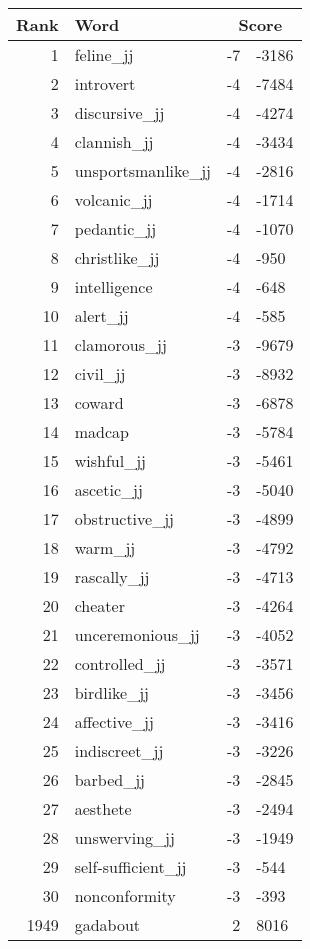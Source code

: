 \begin{longtable}[!htbp]{| rlr@{.}l |}
    \hline
    \textbf{Rank} & \textbf{Word} & \multicolumn{2}{c|}{\textbf{Score}} \\
    \hline
    \endhead
    1 & feline\_jj & -7 & -3186 \\
    2 & introvert & -4 & -7484 \\
    3 & discursive\_jj & -4 & -4274 \\
    4 & clannish\_jj & -4 & -3434 \\
    5 & unsportsmanlike\_jj & -4 & -2816 \\
    6 & volcanic\_jj & -4 & -1714 \\
    7 & pedantic\_jj & -4 & -1070 \\
    8 & christlike\_jj & -4 & -950 \\
    9 & intelligence & -4 & -648 \\
    10 & alert\_jj & -4 & -585 \\
    11 & clamorous\_jj & -3 & -9679 \\
    12 & civil\_jj & -3 & -8932 \\
    13 & coward & -3 & -6878 \\
    14 & madcap & -3 & -5784 \\
    15 & wishful\_jj & -3 & -5461 \\
    16 & ascetic\_jj & -3 & -5040 \\
    17 & obstructive\_jj & -3 & -4899 \\
    18 & warm\_jj & -3 & -4792 \\
    19 & rascally\_jj & -3 & -4713 \\
    20 & cheater & -3 & -4264 \\
    21 & unceremonious\_jj & -3 & -4052 \\
    22 & controlled\_jj & -3 & -3571 \\
    23 & birdlike\_jj & -3 & -3456 \\
    24 & affective\_jj & -3 & -3416 \\
    25 & indiscreet\_jj & -3 & -3226 \\
    26 & barbed\_jj & -3 & -2845 \\
    27 & aesthete & -3 & -2494 \\
    28 & unswerving\_jj & -3 & -1949 \\
    29 & self-sufficient\_jj & -3 & -544 \\
    30 & nonconformity & -3 & -393 \\
    1949 & gadabout & 2 & 8016 \\

\end{longtable}
